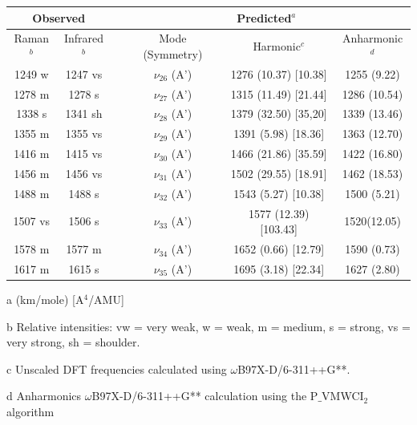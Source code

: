 	
	
	
	
	
		\begin{table}[H]
			\begin{center}
			\begin{threeparttable}
				\begin{tabular}{c c c c c c}
					\hline
					\multicolumn{ 2}{c}{Observed} & \multicolumn{1}{c}{} & \multicolumn{ 3}{c}{Predicted$^{a}$} \\ \hline
					Raman$^{b}$ & \multicolumn{1}{c}{Infrared$^{b}$} &  & \multicolumn{1}{c}{Mode (Symmetry)} & \multicolumn{1}{c}{Harmonic$^{c}$} & Anharmonic$^{d}$ \\ \hline
1249 w & 1247 vs &  & $\nu_{26}$ (A’) & 1276 (10.37) [10.38] & 1255 (9.22) \\ 
1278 m & 1278 s &  & $\nu_{27}$ (A’) & 1315 (11.49) [21.44] &   1286 (10.54) \\ 
1338 s & 1341 sh &  &$\nu_{28}$ (A’) & 1379 (32.50) [35,20] &  1339 (13.46) \\
 1355 m & 1355 vs &  &  $\nu_{29}$ (A’) & 1391 (5.98) [18.36]&   1363 (12.70) \\ 
  1416 m & 1415 vs &  & $\nu_{30}$ (A’) & 1466 (21.86) [35.59] & 1422 (16.80) \\ 
 1456 m & 1456 vs &  &  $\nu_{31}$ (A’) & 1502 (29.55) [18.91] & 1462 (18.53) \\ 
 1488 m & 1488 s &  & $\nu_{32}$ (A’) & 1543 (5.27) [10.38] &     1500 (5.21) \\	
1507 vs & 1506 s &  & $\nu_{33}$ (A’)	& 1577 (12.39) [103.43]	& 1520(12.05)	\\ 
1578 m & 1577 m &  & $\nu_{34}$ (A’) & 1652 (0.66) [12.79] & 1590 (0.73) \\ 
1617 m & 1615 s &  & $\nu_{35}$ (A’)& 1695 (3.18) [22.34]	& 1627 (2.80)\\
	\bottomrule
	
		\end{tabular}
		
				\begin{tablenotes}
					\item[a] (km/mole) [A$^{4}$/AMU]
					\item[b] Relative intensities: vw = very weak, w = weak, m = medium, s = strong, vs = very strong, sh = shoulder.
					\item[c] Unscaled DFT frequencies calculated using $\omega$B97X-D/6-311++G**.
					\item[d] Anharmonics $\omega$B97X-D/6-311++G** calculation using the P$\_$VMWCI$_{2}$ algorithm
				\end{tablenotes}
			\end{threeparttable}
		\end{center}
		\label{freq-Indole}
	\end{table}
	
